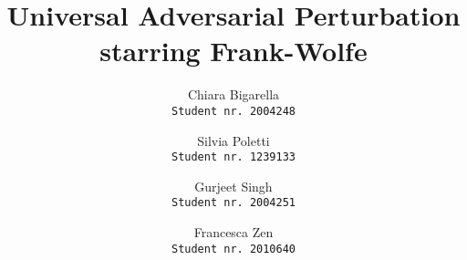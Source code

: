 \documentclass[10pt,twocolumn,letterpaper]{article}
\begin{document}
\title{Universal Adversarial Perturbation \\ starring Frank-Wolfe}
\author{Chiara Bigarella\\{\tt\footnotesize Student nr. 2004248}\and Silvia Poletti\\{\tt\footnotesize Student nr. 1239133}\and Gurjeet Singh\\{\tt\footnotesize Student nr. 2004251}\and Francesca Zen\\{\tt\footnotesize Student nr. 2010640}}
\maketitle









\end{document}
